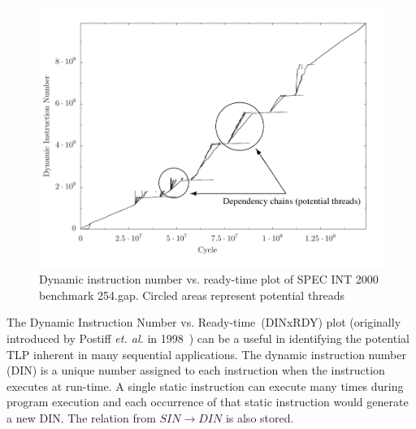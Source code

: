 \documentclass[defaultstyle,11pt]{thesis}
\begin{document}

\begin{figure}
\begin{center}
\includegraphics[width=4.5in]{images/dinrdyexample}
\caption{Dynamic instruction number vs. ready-time plot of SPEC INT 2000 benchmark 254.gap.  Circled areas represent potential threads}
\end{center}
\label{fig:sampledinvrdy}
\end{figure}

The Dynamic Instruction Number vs. Ready-time~(DINxRDY) plot
(originally introduced by Postiff \textit{et. al.} in 1998~\cite{postiff:98:um})
can be a useful in identifying the potential TLP inherent in many
sequential applications.  The dynamic instruction number (DIN) is a
unique number assigned to each instruction when the instruction
executes at run-time.  A single static instruction can execute many
times during program execution and each occurrence of that static
instruction would generate a new DIN.  The relation from $SIN
\rightarrow DIN$ is also stored.
\end{document}
